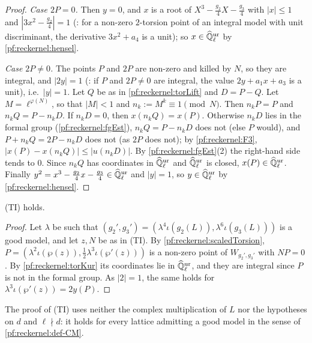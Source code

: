 \begin{proof}
\emph{Case $2P=0$.} Then $y=0$, and $x$ is a root of $X^3-\frac{g_2}4X-\frac{g_3}4$ with $|x|\le1$ and
$|3x^2-\frac{g_2}4|=1$ (: for a non-zero $2$-torsion point of an integral
model with unit discriminant, the derivative $3x^2+a_4$ is a unit); so $x\in\widehat{\mathbb{Q}}{}_\ell^{\mathrm{ur}}$ by \cref{pf:reckernel:hensel}.

\emph{Case $2P\ne0$.} The points $P$ and $2P$ are non-zero and killed by $N$, so they are integral, and
$|2y|=1$ (: if $P$ and $2P\ne0$ are integral, the value $2y+a_1x+a_3$ is a
unit), i.e.\ $|y|=1$. Let $Q$ be as in
\cref{pf:reckernel:torLift} and $D=P-Q$. Let $M=\ell^{\varphi(N)}$, so that $|M|<1$ and $n_k:=M^k\equiv1\pmod N$. Then
$n_kP=P$ and $n_kQ=P-n_kD$. If $n_kD=0$, then $x(n_kQ)=x(P)$. Otherwise $n_kD$ lies in the formal group
(\cref{pf:reckernel:fgEst}), $n_kQ=P-n_kD$ does not (else $P$ would), and $P+n_kQ=2P-n_kD$ does not (as $2P$ does not);
by \ref{pf:reckernel:F3}, $|x(P)-x(n_kQ)|\le|u(n_kD)|$. By \cref{pf:reckernel:fgEst}(2) the right-hand side tends
to $0$. Since $n_kQ$ has coordinates in $\widehat{\mathbb{Q}}{}_\ell^{\mathrm{ur}}$ and $\widehat{\mathbb{Q}}{}_\ell^{\mathrm{ur}}$ is closed, $x(P)\in\widehat{\mathbb{Q}}{}_\ell^{\mathrm{ur}}$. Finally
$y^2=x^3-\frac{g_2}4x-\frac{g_3}4\in\widehat{\mathbb{Q}}{}_\ell^{\mathrm{ur}}$ and $|y|=1$, so $y\in\widehat{\mathbb{Q}}{}_\ell^{\mathrm{ur}}$ by \cref{pf:reckernel:hensel}.
\end{proof}

\begin{theorem}\label{pf:reckernel:cm4}
\textup{(TI)} holds.
\end{theorem}

\begin{proof}
Let $\lambda$ be such that $(g_2',g_3')=(\lambda^4\iota(g_2(L)),\lambda^6\iota(g_3(L)))$ is a good model, and let
$z,N$ be as in \textup{(TI)}. By \cref{pf:reckernel:scaledTorsion}, $P=(\lambda^2\iota(\wp(z)),\frac12\lambda^3
\iota(\wp'(z)))$ is a non-zero point of $W_{g_2',g_3'}$ with $NP=0$. By \cref{pf:reckernel:torKur} its coordinates lie
in $\widehat{\mathbb{Q}}{}_\ell^{\mathrm{ur}}$, and they are integral since $P$ is not in the formal group. As $|2|=1$, the same holds for
$\lambda^3\iota(\wp'(z))=2y(P)$.
\end{proof}

\begin{remark}
The proof of (TI) uses neither the complex multiplication of $L$ nor the hypotheses on $d$ and
$\ell\nmid d$: it holds for every lattice admitting a good model in the sense of \cref{pf:reckernel:def-CM}.
\end{remark}

